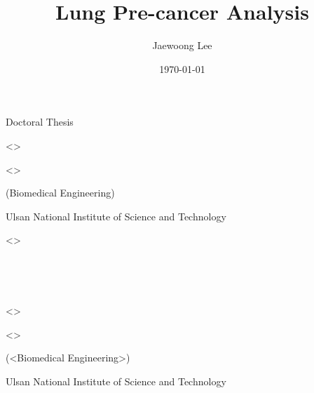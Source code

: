 \documentclass[11pt,a4paper,onecolumn,oneside]{report}
\title{Lung Pre-cancer Analysis}
\author{Jaewoong Lee}
\date{\today}
\begin{document}
    \makeatletter
    \begin{center}
        \LARGE Doctoral Thesis

        \vspace{3cm}
        \huge <\@title>

        \vfill

        \LARGE <\@author>

        \vspace{2cm}


        \LARGE (Biomedical Engineering)

        \vspace{2cm}

        \LARGE Ulsan National Institute of Science and Technology
        \vspace{2cm}

        \LARGE <\the\year{}>
    \end{center}
    \thispagestyle{empty}
    \newpage

    \begin{center}
        \hbox{ }

        \hbox{ }

        \huge <\@title>

        \vspace{5cm}

        \LARGE <\@author>

        \vspace{6cm}


        \LARGE (<Biomedical Engineering>)

        \vspace{2cm}

        \LARGE Ulsan National Institute of Science and Technology
    \end{center}
    \makeatother
    \thispagestyle{empty}
    \newpage

    \begin{abstract}
        \vfill
    \end{abstract}
    \newpage

    \hbox{}
    \thispagestyle{empty}
    \newpage

    \tableofcontents{}
    \thispagestyle{empty}
    \vfill
    \newpage

    \listoffigures{}
    \thispagestyle{empty}
    \newpage
\end{document}
